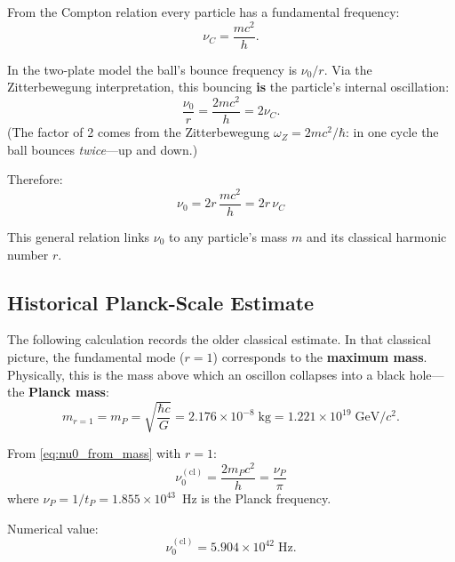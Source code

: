 \documentclass[11pt]{article}
\begin{document}
From the Compton relation every particle has a fundamental
frequency:
\begin{equation}
  \nu_C = \frac{mc^2}{h}.
  \label{eq:compton_def}
\end{equation}

In the two-plate model the ball's bounce frequency is $\nu_0/r$.
Via the Zitterbewegung interpretation, this bouncing \textbf{is}
the particle's internal oscillation:
\begin{equation}
  \frac{\nu_0}{r} = \frac{2mc^2}{h}
  = 2\nu_C.
  \label{eq:bounce_compton}
\end{equation}
(The factor of 2 comes from the Zitterbewegung
$\omega_Z = 2mc^2/\hbar$: in one cycle the ball bounces
\emph{twice}---up and down.)

Therefore:
\begin{equation}
  \nu_0 = 2r\,\frac{mc^2}{h}
  = 2r\,\nu_C
  \label{eq:nu0_from_mass}
\end{equation}

This general relation links $\nu_0$ to any particle's
mass $m$ and its classical harmonic number $r$.

\subsection{Historical Planck-Scale Estimate}

The following calculation records the older classical estimate.  In
that classical picture, the fundamental mode ($r = 1$) corresponds to the
\textbf{maximum mass}. Physically, this is the mass above which
an oscillon collapses into a black hole---the
\textbf{Planck mass}:
\begin{equation}
  m_{r=1} = m_P = \sqrt{\frac{\hbar c}{G}}
  = 2.176 \times 10^{-8}\;\mathrm{kg}
  = 1.221 \times 10^{19}\;\mathrm{GeV}/c^2.
  \label{eq:planck_mass}
\end{equation}

From \eqref{eq:nu0_from_mass} with $r = 1$:
\begin{equation}
  \nu_0^{(\mathrm{cl})} = \frac{2m_P c^2}{h}
  = \frac{\nu_P}{\pi}
  \label{eq:nu0_value}
\end{equation}
where $\nu_P = 1/t_P = 1.855 \times 10^{43}$~Hz
is the Planck frequency.

Numerical value:
\begin{equation}
  \nu_0^{(\mathrm{cl})} = 5.904 \times 10^{42}\;\mathrm{Hz}.
  \label{eq:nu0_numerical}
\end{equation}
\end{document}
